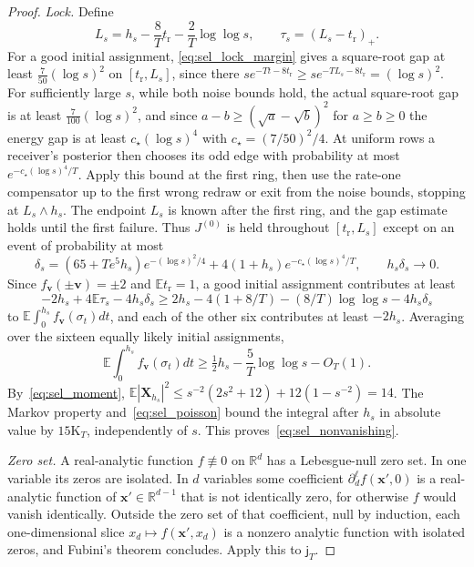 \begin{proof}
\emph{Lock.} Define
\[
L_s=h_s-\frac8Tt_{\mathrm r}-\frac2T\log\log s,\qquad\tau_s=(L_s-t_{\mathrm r})_+.
\]
For a good initial assignment, \eqref{eq:sel_lock_margin} gives a square-root gap at least $\frac7{50}(\log s)^2$ on $[t_{\mathrm r},L_s]$, since there $se^{-Tt-8t_{\mathrm r}}\ge se^{-TL_s-8t_{\mathrm r}}=(\log s)^2$. For sufficiently large $s$, while both noise bounds hold, the actual square-root gap is at least $\frac7{100}(\log s)^2$, and since $a-b\ge(\sqrt a-\sqrt b)^2$ for $a\ge b\ge0$ the energy gap is at least $c_\star(\log s)^4$ with $c_\star=(7/50)^2/4$. At uniform rows a receiver's posterior then chooses its odd edge with probability at most $e^{-c_\star(\log s)^4/T}$. Apply this bound at the first ring, then use the rate-one compensator up to the first wrong redraw or exit from the noise bounds, stopping at $L_s\wedge h_s$. The endpoint $L_s$ is known after the first ring, and the gap estimate holds until the first failure. Thus $J^{(0)}$ is held throughout $[t_{\mathrm r},L_s]$ except on an event of probability at most
\begin{equation}
\delta_s=(65+Te^5h_s)e^{-(\log s)^2/4}+4(1+h_s)e^{-c_\star(\log s)^4/T},\qquad h_s\delta_s\to0.
\label{eq:sel_lock_failure}
\end{equation}
Since $f_{\mathbf v}(\pm\mathbf v)=\pm2$ and $\mathbb Et_{\mathrm r}=1$, a good initial assignment contributes at least
\[
-2h_s+4\mathbb E\tau_s-4h_s\delta_s\ge2h_s-4(1+8/T)-(8/T)\log\log s-4h_s\delta_s
\]
to $\mathbb E\int_0^{h_s}f_{\mathbf v}(\sigma_t)dt$, and each of the other six contributes at least $-2h_s$. Averaging over the sixteen equally likely initial assignments,
\[
\mathbb E\int_0^{h_s}f_{\mathbf v}(\sigma_t)dt\ge\tfrac12h_s-\frac5T\log\log s-O_T(1).
\]
By~\eqref{eq:sel_moment}, $\mathbb E|\mathbf X_{h_s}|^2\le s^{-2}(2s^2+12)+12(1-s^{-2})=14$. The Markov property and~\eqref{eq:sel_poisson} bound the integral after $h_s$ in absolute value by $15\mathrm K_T$, independently of $s$. This proves~\eqref{eq:sel_nonvanishing}.

\emph{Zero set.} A real-analytic function $f\not\equiv0$ on $\mathbb R^d$ has a Lebesgue-null zero set. In one variable its zeros are isolated. In $d$ variables some coefficient $\partial_d^\ell f(\mathbf x',0)$ is a real-analytic function of $\mathbf x'\in\mathbb R^{d-1}$ that is not identically zero, for otherwise $f$ would vanish identically. Outside the zero set of that coefficient, null by induction, each one-dimensional slice $x_d\mapsto f(\mathbf x',x_d)$ is a nonzero analytic function with isolated zeros, and Fubini's theorem concludes. Apply this to $\mathsf j_T$.
\end{proof}

